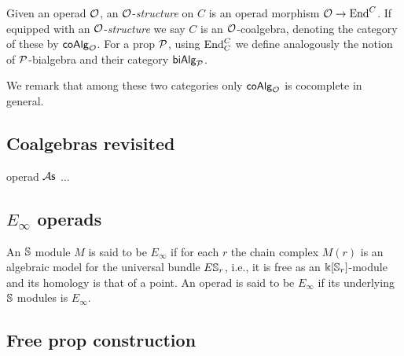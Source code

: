Given an operad $\O$, an $\O$-\textit{structure} on $C$ is an operad morphism $\O \to \End^C$.
If equipped with an \mbox{$\O$-\textit{structure}} we say $C$ is an $\O$-coalgebra, denoting the category of these by $\coAlg_\O$.
For a prop $\P$, using $\End_C^C$ we define analogously the notion of $\P$-bialgebra and their category $\biAlg_\P$.

We remark that among these two categories only $\coAlg_\O$ is cocomplete in general.

\subsection{Coalgebras revisited}

operad $\As$ ...

\subsection{$E_\infty$ operads}

An $\S$ module $M$ is said to be $E_\infty$ if for each $r$ the chain complex $M(r)$ is an algebraic model for the universal bundle $E\S_r$, i.e., it is free as an $\k[\S_r]$-module and its homology is that of a point.
An operad is said to be $E_\infty$ if its underlying $\S$ modules is $E_\infty$.

\subsection{Free prop construction}

